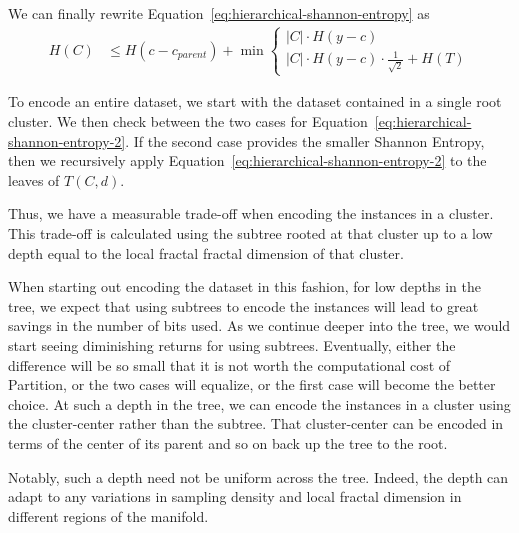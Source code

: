 We can finally rewrite Equation~\ref{eq:hierarchical-shannon-entropy} as
\begin{align}
    \label{eq:hierarchical-shannon-entropy-2}
    H(C) &\leq H(c - c_{parent}) + \min \begin{cases}
        |C| \cdot H(y - c) \\
        |C| \cdot H(y - c) \cdot \frac{1}{\sqrt{2}} + H(T)
    \end{cases}
\end{align}

To encode an entire dataset, we start with the dataset contained in a single root cluster.
We then check between the two cases for Equation~\ref{eq:hierarchical-shannon-entropy-2}.
If the second case provides the smaller Shannon Entropy, then we recursively apply Equation~\ref{eq:hierarchical-shannon-entropy-2} to the leaves of $T(C,d)$.

Thus, we have a measurable trade-off when encoding the instances in a cluster.
This trade-off is calculated using the subtree rooted at that cluster up to a low depth equal to the local fractal fractal dimension of that cluster.

When starting out encoding the dataset in this fashion, for low depths in the tree, we expect that using subtrees to encode the instances will lead to great savings in the number of bits used.
As we continue deeper into the tree, we would start seeing diminishing returns for using subtrees.
Eventually, either the difference will be so small that it is not worth the computational cost of Partition, or the two cases will equalize, or the first case will become the better choice.
At such a depth in the tree, we can encode the instances in a cluster using the cluster-center rather than the subtree.
That cluster-center can be encoded in terms of the center of its parent and so on back up the tree to the root.

Notably, such a depth need not be uniform across the tree.
Indeed, the depth can adapt to any variations in sampling density and local fractal dimension in different regions of the manifold.
